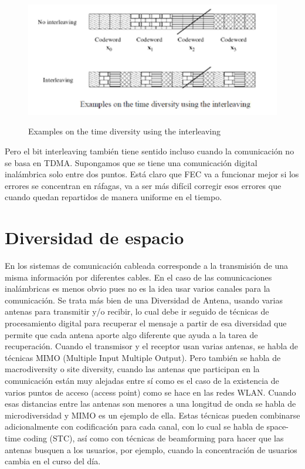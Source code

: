 \begin{figure}[h!]
	\captionsetup{justification = raggedright, singlelinecheck = false}
	\caption{Examples on the time diversity using the interleaving } 
	\centering
	\includegraphics[scale=1]{Imagenes/Interrelacion.png}
	\label{fig:Interrelacion}
\end{figure}

Pero el bit interleaving también tiene sentido incluso cuando la comunicación no se basa en TDMA. Supongamos que se tiene una comunicación digital inalámbrica solo entre dos puntos. Está claro que FEC va a funcionar mejor si los errores se concentran en ráfagas, va a ser más difícil corregir esos errores que cuando quedan repartidos de manera uniforme en el tiempo. \\

\section{Diversidad de espacio}

En los sistemas de comunicación cableada corresponde a la transmisión de una misma información por diferentes cables. En el caso de las comunicaciones inalámbricas es menos obvio pues no es la idea usar varios canales para la comunicación. Se trata más bien de una Diversidad de Antena, usando varias antenas para transmitir y/o recibir, lo cual debe ir seguido de técnicas de procesamiento digital para recuperar el mensaje a partir de esa diversidad que permite que cada antena aporte algo diferente que ayuda a la tarea de recuperación. Cuando el transmisor y el receptor usan varias antenas, se habla de técnicas MIMO (Multiple Input Multiple Output). Pero también se habla de macrodiversity o site diversity, cuando las antenas que participan en la comunicación están muy alejadas entre sí como es el caso de la existencia de varios puntos de acceso (access point) como se hace en las redes WLAN. Cuando esas distancias entre las antenas son menores a una longitud de onda se habla de microdiversidad y MIMO es un ejemplo de ella. Estas técnicas pueden combinarse adicionalmente con codificación para cada canal, con lo cual se habla de space-time coding (STC), así como con técnicas de beamforming para hacer que las antenas busquen a los usuarios, por ejemplo, cuando la concentración de usuarios cambia en el curso del día.   \\

